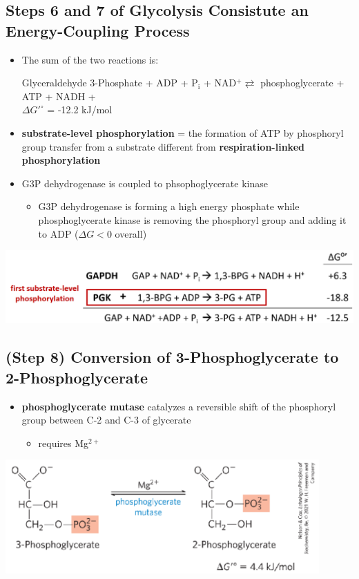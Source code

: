 \documentclass[10pt]{article}
\newcommand{\proton}{\text{H$^+$}}
\newcommand{\pc}{$^+$}
\begin{document}
\subsection*{Steps 6 and 7 of Glycolysis Consistute an Energy-Coupling Process}
\begin{itemize}
	\item The sum of the two reactions is:
	\begin{center}
        Glyceraldehyde 3-Phosphate + ADP + P$_{\text{i}}$ + NAD\pc $\rightleftarrows$ phosphoglycerate + ATP + NADH + \proton\\
        $\Delta G'^\circ$ = -12.2 kJ/mol
    \end{center}
    \item \textbf{substrate-level phosphorylation} = the formation of ATP by phosphoryl group transfer from a substrate different from \textbf{respiration-linked phosphorylation}
    \item G3P dehydrogenase is coupled to phsophoglycerate kinase
    \begin{itemize}
        \item G3P dehydrogenase is forming a high energy phosphate while phosphoglycerate kinase is removing the phosphoryl group and adding it to ADP ($\Delta G < 0$ overall)
    \end{itemize}
\end{itemize}
\begin{center} 
	\includegraphics*[width=\textwidth]{L1_16.png}
\end{center}

\subsection*{(Step 8) Conversion of 3-Phosphoglycerate to 2-Phosphoglycerate}
\begin{itemize}
	\item \textbf{phosphoglycerate mutase} catalyzes a reversible shift of the phosphoryl group between C-2 and C-3 of glycerate
	\begin{itemize}
        \item requires Mg$^{2+}$
    \end{itemize}
\end{itemize}
\begin{center} 
	\includegraphics*[width=0.9\textwidth]{L1_17.png}
\end{center}
\end{document}
